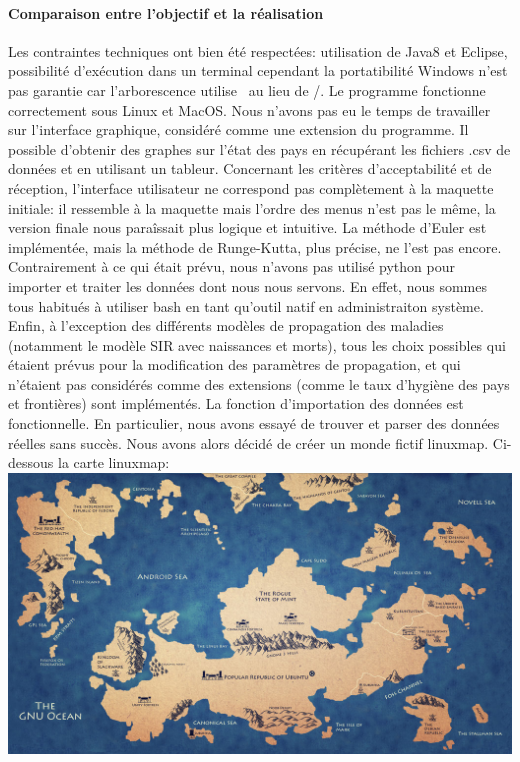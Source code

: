 \documentclass[12pt,a4paper]{report}
\begin{document}
\paragraph{Comparaison entre l'objectif et la réalisation}
\begin{flushleft}
	Les contraintes techniques ont bien été respectées: utilisation de Java8 et Eclipse, possibilité d'exécution dans un terminal cependant la portatibilité Windows n'est pas garantie car l'arborescence utilise \ au lieu de /. Le programme fonctionne correctement sous Linux et MacOS. Nous n'avons pas eu le temps de travailler sur l'interface graphique, considéré comme une 
extension du programme. Il possible d'obtenir des graphes sur l'état des pays en récupérant les fichiers .csv de données et en utilisant un tableur. \newline
Concernant les critères d'acceptabilité et de réception, l'interface utilisateur ne correspond pas complètement à la maquette initiale: il ressemble à la maquette mais l'ordre des menus n'est pas le même, la version finale nous paraîssait plus logique et 
intuitive. La méthode d'Euler est implémentée, mais la méthode de Runge-Kutta, plus précise, ne l'est pas encore. \newline
Contrairement à ce qui était prévu, nous n'avons pas utilisé python pour importer et traiter les données dont nous nous servons. En effet, nous sommes tous habitués à utiliser bash en tant qu'outil natif en administraiton système. \newline
Enfin, à l'exception des différents modèles de propagation des maladies (notamment le modèle SIR avec naissances et morts), tous les choix possibles qui étaient prévus pour la modification des paramètres de propagation, et qui n'étaient pas considérés comme 
des extensions (comme le taux d'hygiène des pays et frontières) sont implémentés. \newline
La fonction d'importation des données est fonctionnelle. En particulier, nous avons essayé de trouver et parser des données réelles sans succès. Nous avons alors décidé de créer un monde fictif linuxmap. Ci-dessous la carte linuxmap:
\includegraphics[angle=270 , scale=0.5]{linuxmap.jpg}


\end{flushleft}
\end{document}
